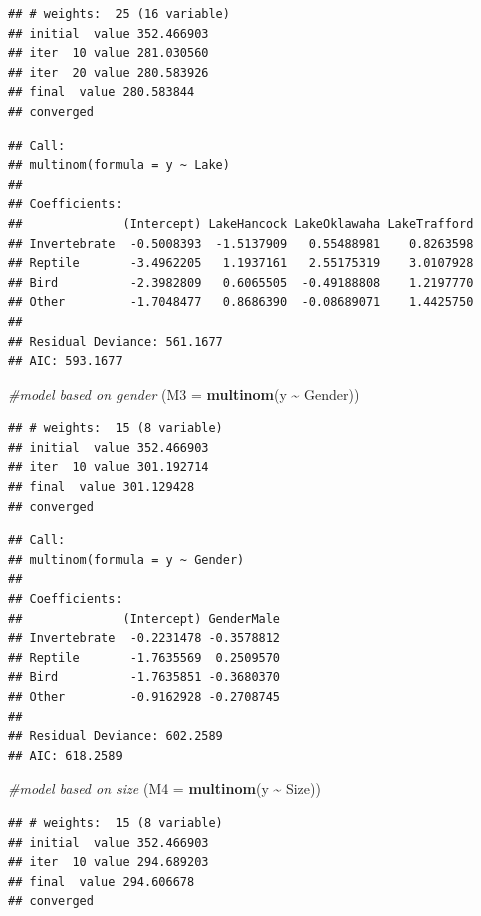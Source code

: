 \documentclass[
]{article}
\newenvironment{Shaded}{\begin{snugshade}}{\end{snugshade}}
\newcommand{\AttributeTok}[1]{\textcolor[rgb]{0.13,0.29,0.53}{#1}}
\newcommand{\CommentTok}[1]{\textcolor[rgb]{0.56,0.35,0.01}{\textit{#1}}}
\newcommand{\FunctionTok}[1]{\textcolor[rgb]{0.13,0.29,0.53}{\textbf{#1}}}
\newcommand{\NormalTok}[1]{#1}
\newcommand{\SpecialCharTok}[1]{\textcolor[rgb]{0.81,0.36,0.00}{\textbf{#1}}}
\begin{document}
\begin{verbatim}
## # weights:  25 (16 variable)
## initial  value 352.466903 
## iter  10 value 281.030560
## iter  20 value 280.583926
## final  value 280.583844 
## converged
\end{verbatim}

\begin{verbatim}
## Call:
## multinom(formula = y ~ Lake)
## 
## Coefficients:
##              (Intercept) LakeHancock LakeOklawaha LakeTrafford
## Invertebrate  -0.5008393  -1.5137909   0.55488981    0.8263598
## Reptile       -3.4962205   1.1937161   2.55175319    3.0107928
## Bird          -2.3982809   0.6065505  -0.49188808    1.2197770
## Other         -1.7048477   0.8686390  -0.08689071    1.4425750
## 
## Residual Deviance: 561.1677 
## AIC: 593.1677
\end{verbatim}

\begin{Shaded}
\begin{Highlighting}[]
\CommentTok{\#model based on gender}
\NormalTok{(}\AttributeTok{M3 =} \FunctionTok{multinom}\NormalTok{(y }\SpecialCharTok{\textasciitilde{}}\NormalTok{ Gender))}
\end{Highlighting}
\end{Shaded}

\begin{verbatim}
## # weights:  15 (8 variable)
## initial  value 352.466903 
## iter  10 value 301.192714
## final  value 301.129428 
## converged
\end{verbatim}

\begin{verbatim}
## Call:
## multinom(formula = y ~ Gender)
## 
## Coefficients:
##              (Intercept) GenderMale
## Invertebrate  -0.2231478 -0.3578812
## Reptile       -1.7635569  0.2509570
## Bird          -1.7635851 -0.3680370
## Other         -0.9162928 -0.2708745
## 
## Residual Deviance: 602.2589 
## AIC: 618.2589
\end{verbatim}

\begin{Shaded}
\begin{Highlighting}[]
\CommentTok{\#model based on size}
\NormalTok{(}\AttributeTok{M4 =} \FunctionTok{multinom}\NormalTok{(y }\SpecialCharTok{\textasciitilde{}}\NormalTok{ Size))}
\end{Highlighting}
\end{Shaded}

\begin{verbatim}
## # weights:  15 (8 variable)
## initial  value 352.466903 
## iter  10 value 294.689203
## final  value 294.606678 
## converged
\end{verbatim}
\end{document}
